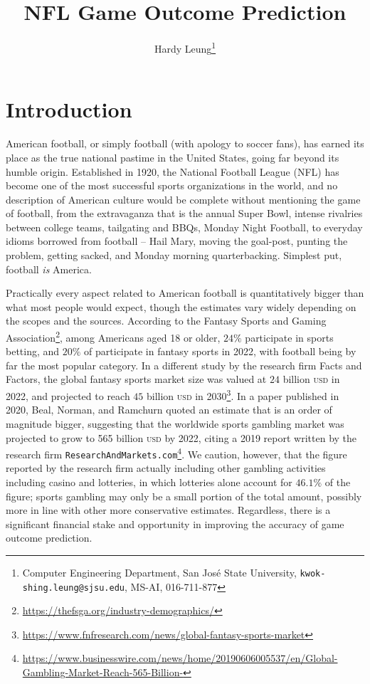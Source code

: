 \documentclass[10pt]{article}
\title{NFL Game Outcome Prediction}
\date{}
\begin{document}
\author{
Hardy Leung\thanks{
Computer Engineering Department, San José State University, \texttt{kwok-shing.leung@sjsu.edu}, MS-AI, 016-711-877} }

\maketitle

\section{Introduction}

American football, or simply football (with apology to soccer fans), has earned
its place as the true national pastime in the United States,
going far beyond its humble origin. Established in 1920,
the National Football League (NFL)
has become one of the most successful sports organizations in the world,
and no description of American culture would be complete without
mentioning the game of football, from the
extravaganza that is the annual Super Bowl, intense rivalries between
college teams, tailgating and BBQs, Monday Night Football, to
everyday idioms borrowed from football -- Hail Mary, moving the goal-post,
punting the problem, getting sacked, and Monday morning quarterbacking.
Simplest put, football {\em is} America.

Practically every aspect related to American football is quantitatively
bigger than what most people would expect,
though the estimates vary
widely depending on the scopes and the sources.
According to the Fantasy Sports and Gaming Association\footnote{
\url{https://thefsga.org/industry-demographics/}},
among Americans aged 18 or
older, $24\%$ participate in sports betting, and $20\%$ of participate in
fantasy sports in 2022, with football being by far the most popular category.
In a different study by the research firm Facts and Factors, the
global fantasy sports market size was valued at $24$ billion \textsc{usd}
in 2022,
and projected to reach $45$ billion \textsc{usd} in 2030\footnote{
\url{https://www.fnfresearch.com/news/global-fantasy-sports-market}}.
In a paper published in 2020, Beal, Norman, and Ramchurn \cite{BeNo2020}
 quoted an estimate that is an order of magnitude
bigger,
suggesting that the worldwide sports gambling market was projected to grow
to 565 billion \textsc{usd} by 2022, citing a 2019 report written
by the research firm \texttt{ResearchAndMarkets.com}\footnote{
\url{https://www.businesswire.com/news/home/20190606005537/en/Global-Gambling-Market-Reach-565-Billion-}}. We caution, however, that the figure reported
by the research firm actually including other gambling activities including
casino and lotteries, in which lotteries alone account for $46.1\%$ of
the figure; sports gambling may only be a small portion of the
total amount, possibly more in line with other more conservative estimates.
Regardless,
there is a significant financial stake and opportunity
in improving the accuracy of game outcome prediction.
\end{document}
